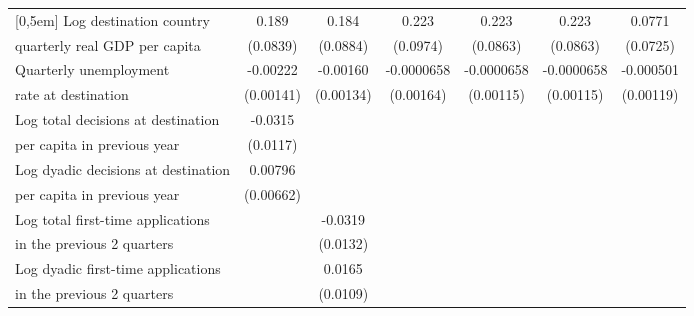 \begin{table}[!ht]
\begin{tabular}{l*{6}{c}}
[0,5em]
Log destination country&       0.189\sym{*}  &       0.184\sym{*}  &       0.223\sym{*}  &       0.223\sym{*}  &       0.223\sym{*}  &      0.0771         \\
 quarterly real GDP per capita                    &    (0.0839)         &    (0.0884)         &    (0.0974)         &    (0.0863)         &    (0.0863)         &    (0.0725)         \\
[0,5em]
Quarterly unemployment &    -0.00222         &    -0.00160         &  -0.0000658         &  -0.0000658         &  -0.0000658         &   -0.000501         \\
rate at destination                    &   (0.00141)         &   (0.00134)         &   (0.00164)         &   (0.00115)         &   (0.00115)         &   (0.00119)         \\
[0,5em]
Log total decisions at destination &     -0.0315\sym{**} &                     &                     &                     &                     &                     \\
per capita in previous year                    &    (0.0117)         &                     &                     &                     &                     &                     \\
[0,5em]
Log dyadic decisions at destination &     0.00796         &                     &                     &                     &                     &                     \\
per capita in previous year                    &   (0.00662)         &                     &                     &                     &                     &                     \\
[0,5em]
Log total first-time applications&                     &     -0.0319\sym{*}  &                     &                     &                     &                     \\
 in the previous 2 quarters                    &                     &    (0.0132)         &                     &                     &                     &                     \\
[0,5em]
Log dyadic first-time applications&                     &      0.0165         &                     &                     &                     &                     \\
 in the previous 2 quarters                    &                     &    (0.0109)         &                     &                     &                     &                     \\

\end{tabular}
\end{table}
